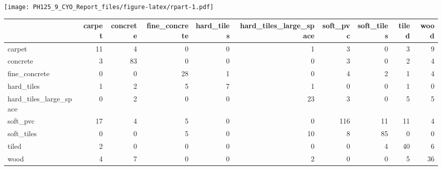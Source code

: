 \documentclass[]{article}
\newenvironment{Shaded}{\begin{snugshade}}{\end{snugshade}}
\newcommand{\CommentTok}[1]{\textcolor[rgb]{0.56,0.35,0.01}{\textit{#1}}}
\newcommand{\DataTypeTok}[1]{\textcolor[rgb]{0.13,0.29,0.53}{#1}}
\newcommand{\KeywordTok}[1]{\textcolor[rgb]{0.13,0.29,0.53}{\textbf{#1}}}
\newcommand{\NormalTok}[1]{#1}
\newcommand{\OperatorTok}[1]{\textcolor[rgb]{0.81,0.36,0.00}{\textbf{#1}}}
\newcommand{\StringTok}[1]{\textcolor[rgb]{0.31,0.60,0.02}{#1}}
\begin{document}
\texttt{[image: PH125\_9\_CYO\_Report\_files/figure-latex/rpart-1.pdf]}

\begin{Shaded}
\end{Shaded}

\begin{longtable}[]{@{}lrrrrrrrrr@{}}
\toprule
& carpet & concrete & fine\_concrete & hard\_tiles &
hard\_tiles\_large\_space & soft\_pvc & soft\_tiles & tiled &
wood\tabularnewline
\midrule
\endhead
carpet & 11 & 4 & 0 & 0 & 1 & 3 & 0 & 3 & 9\tabularnewline
concrete & 3 & 83 & 0 & 0 & 0 & 3 & 0 & 2 & 4\tabularnewline
fine\_concrete & 0 & 0 & 28 & 1 & 0 & 4 & 2 & 1 & 4\tabularnewline
hard\_tiles & 1 & 2 & 5 & 7 & 1 & 0 & 0 & 1 & 0\tabularnewline
hard\_tiles\_large\_space & 0 & 2 & 0 & 0 & 23 & 3 & 0 & 5 &
5\tabularnewline
soft\_pvc & 17 & 4 & 5 & 0 & 0 & 116 & 11 & 11 & 4\tabularnewline
soft\_tiles & 0 & 0 & 5 & 0 & 10 & 8 & 85 & 0 & 0\tabularnewline
tiled & 2 & 0 & 0 & 0 & 0 & 0 & 4 & 40 & 6\tabularnewline
wood & 4 & 7 & 0 & 0 & 2 & 0 & 0 & 5 & 36\tabularnewline
\bottomrule
\end{longtable}

\begin{Shaded}
\end{Shaded}
\end{document}

